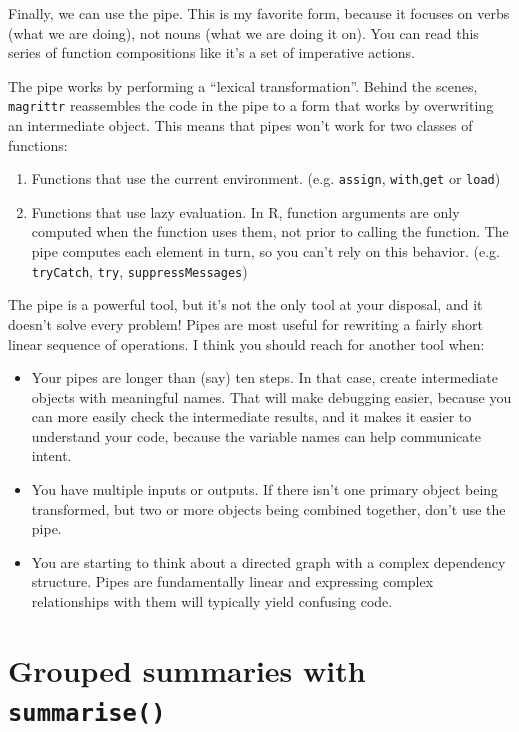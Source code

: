 \documentclass[]{book}
\providecommand{\tightlist}{%
  \setlength{\itemsep}{0pt}\setlength{\parskip}{0pt}}
\theoremstyle{definition}
\theoremstyle{definition}
\theoremstyle{definition}
\theoremstyle{remark}
\begin{document}
Finally, we can use the pipe. This is my favorite form, because it
focuses on verbs (what we are doing), not nouns (what we are doing it
on). You can read this series of function compositions like it's a set
of imperative actions.

The pipe works by performing a ``lexical transformation''. Behind the
scenes, \texttt{magrittr} reassembles the code in the pipe to a form
that works by overwriting an intermediate object. This means that pipes
won't work for two classes of functions:

\begin{enumerate}
\def\labelenumi{\arabic{enumi}.}
\tightlist
\item
  Functions that use the current environment. (e.g. \texttt{assign},
  \texttt{with},\texttt{get} or \texttt{load})
\item
  Functions that use lazy evaluation. In R, function arguments are only
  computed when the function uses them, not prior to calling the
  function. The pipe computes each element in turn, so you can't rely on
  this behavior. (e.g. \texttt{tryCatch}, \texttt{try},
  \texttt{suppressMessages})
\end{enumerate}

The pipe is a powerful tool, but it's not the only tool at your
disposal, and it doesn't solve every problem! Pipes are most useful for
rewriting a fairly short linear sequence of operations. I think you
should reach for another tool when:

\begin{itemize}
\tightlist
\item
  Your pipes are longer than (say) ten steps. In that case, create
  intermediate objects with meaningful names. That will make debugging
  easier, because you can more easily check the intermediate results,
  and it makes it easier to understand your code, because the variable
  names can help communicate intent.
\item
  You have multiple inputs or outputs. If there isn't one primary object
  being transformed, but two or more objects being combined together,
  don't use the pipe.
\item
  You are starting to think about a directed graph with a complex
  dependency structure. Pipes are fundamentally linear and expressing
  complex relationships with them will typically yield confusing code.
\end{itemize}

\section{\texorpdfstring{Grouped summaries with
\texttt{summarise()}}{Grouped summaries with summarise()}}\label{grouped-summaries-with-summarise}
\end{document}
